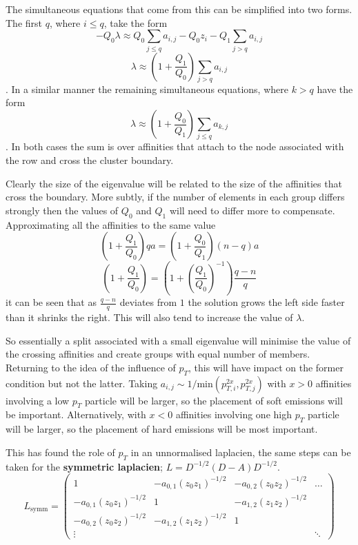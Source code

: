 The simultaneous equations that come from this can be simplified into two forms.
The first \(q\), where \(i \leq q\), take the form
\begin{equation}-Q_0 \lambda \approx Q_0 \sum_{j \leq q} a_{i,j} - Q_0 z_i - Q_1\sum_{j>q} a_{i,j}\end{equation}
\begin{equation}\lambda \approx \left(1 + \frac{Q_1}{Q_0}\right)\sum_{j>q} a_{i,j}\end{equation}.
In a similar manner the remaining simultaneous equations, where \(k > q\) have the form
\begin{equation}\lambda \approx \left(1 + \frac{Q_0}{Q_1}\right)\sum_{j\leq q} a_{k,j}\end{equation}.
In both cases the sum is over affinities that attach to the node associated with the row
and cross the cluster boundary.

Clearly the size of the eigenvalue will be related to the size of the affinities that cross the boundary.
More subtly, if the number of elements in each group differs strongly then the values of \(Q_0\) and \(Q_1\)
will need to differ more to compensate.
Approximating all the affinities to the same value
\begin{equation}\left(1 + \frac{Q_1}{Q_0}\right)qa = \left(1 + \frac{Q_0}{Q_1}\right)(n-q)a\end{equation}
\begin{equation}\left(1 + \frac{Q_1}{Q_0}\right) = \left(1 + \left(\frac{Q_1}{Q_0}\right)^{-1}\right)\frac{q-n}{q}\end{equation}
it can be seen that as \(\frac{q-n}{q}\) deviates from \(1\) the solution grows the left side faster than it shrinks the right.
This will also tend to increase the value of \(\lambda\).

So essentially a split associated with a small eigenvalue will minimise the value of the crossing affinities
and create groups with equal number of members.
Returning to the idea of the influence of \(p_T\), this will have impact on the former condition but not the latter.
Taking \(a_{i,j} \sim 1/\text{min}(p_{T,i}^{2x}, p_{T,j}^{2x})\) with \(x>0\) affinities involving a low \(p_T\)
particle will be larger, so the placement of soft emissions will be important.
Alternatively, with \(x < 0\) affinities involving one high \(p_T\) particle will be larger,
so the placement of hard emissions will be most important.

This has found the role of \(p_T\) in an unnormalised laplacien,
the same steps can be taken for the \textbf{symmetric laplacien}; \(L = D^{-1/2}(D -A) D^{-1/2}\).
\begin{equation}
    L_\text{symm} = 
    \begin{pmatrix}
        1 & -a_{0,1}(z_0z_1)^{-1/2} & -a_{0,2}(z_0z_2)^{-1/2} & \hdots \\
        -a_{0,1}(z_0z_1)^{-1/2} & 1 & -a_{1,2}(z_1z_2)^{-1/2} & \\
        -a_{0,2}(z_0z_2)^{-1/2} & -a_{1,2}(z_1z_2)^{-1/2} & 1 & \\
        \vdots   &          &     & \ddots 
    \end{pmatrix}
\end{equation}

